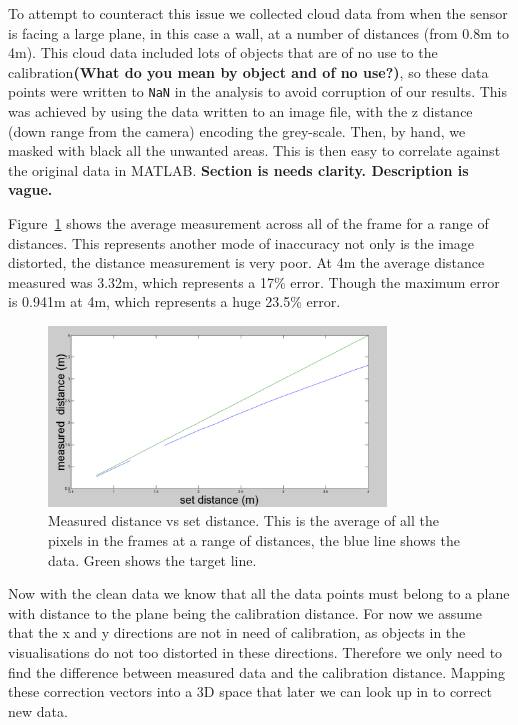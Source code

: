 \documentclass[]{article}
\begin{document}
{To attempt to counteract this issue we collected cloud data from when the sensor is facing a large plane, in this case a wall, at a number of distances (from 0.8m to 4m). This cloud data included lots of objects that are of no use to the calibration\textbf{(What do you mean by object and of no use?)}, so these data points were written to \verb"NaN" in the analysis to avoid corruption of our results. This was achieved by using the data written to an image file, with the z distance (down range from the camera) encoding the grey-scale. Then, by hand, we masked with black all the unwanted areas. This is then easy to correlate against the original data in MATLAB. \textbf{Section is needs clarity. Description is vague.}

Figure~\ref{fig:avDist} shows the average measurement across all of the frame for a range of distances. This represents another mode of inaccuracy not only is the image distorted, the distance measurement is very poor. At 4m the average distance measured was 3.32m, which represents a 17\% error. Though the maximum error is 0.941m at 4m, which represents a huge 23.5\% error. 

\begin{figure}[htb]
	\begin{center}
		\includegraphics[width = 0.8\textwidth]{avDist}
	\end{center}
	\caption{Measured distance vs set distance. This is the average of all the pixels in the frames at a range of distances, the blue line shows the data. Green shows the target line.}
	\label{fig:avDist}
\end{figure}

Now with the clean data we know that all the data points must belong to a plane with distance to the plane being the calibration distance. For now we assume that the x and y directions are not in need of calibration, as objects in the visualisations do not too distorted in these directions. Therefore we only need to find the difference between measured data and the calibration distance. Mapping these correction vectors into a 3D space that later we can look up in to correct new data. 

}
\end{document}
